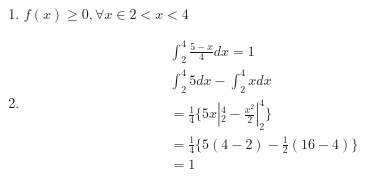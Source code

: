\documentclass[11pt,a4paper]{book}
\begin{document}
\begin{description}
\begin{enumerate}[label=(\alph*)]
\begin{enumerate}[leftmargin=*, label=\Roman*., widest=IV, align=left]
               \begin{enumerate} %
                 \item $f(x)\geq 0, \forall x \in  2<x<4$
                 \item 
                   \begin{align*}
                     \int_{2}^4 \frac{5-x}{4}dx=1\\
                     \int_{2}^4 5 dx - \int_{2}^4 x dx  \\
                     = \frac{1}{4} \{5x|^4_2 - \frac{x^2}{2}|^4_2 \}\\
                     = \frac{1}{4} \{5(4-2)- \frac{1}{2}(16-4)\} \\
                     = 1
                   \end{align*}
               \end{enumerate}


\end{enumerate}
\end{enumerate}
\end{description}
\end{document}
